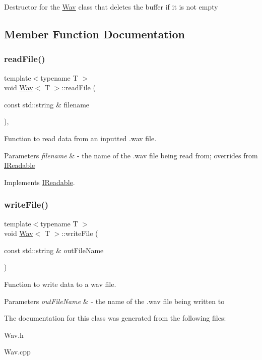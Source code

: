 Destructor for the \hyperlink{classWav}{Wav} class that deletes the buffer if it is not empty 

\subsection{Member Function Documentation}
\mbox{\label{classWav_a636a94bf0f23a4cdc9d8d59d9d567f3e}} 
\subsubsection{\texorpdfstring{read\+File()}{readFile()}}
{\footnotesize\ttfamily template$<$typename T $>$ \\
void \hyperlink{classWav}{Wav}$<$ T $>$\+::read\+File (\begin{DoxyParamCaption}\item[{const std\+::string \&}]{filename }\end{DoxyParamCaption})\hspace{0.3cm}{\ttfamily [override]}, {\ttfamily [virtual]}}



Function to read data from an inputted .wav file. 


\begin{DoxyParams}{Parameters}
{\em filename} & -\/ the name of the .wav file being read from; overrides from \hyperlink{classIReadable}{I\+Readable} \\
\hline
\end{DoxyParams}


Implements \hyperlink{classIReadable}{I\+Readable}.

\mbox{\label{classWav_afbae07371a8e0f17cc8e3a29507016e3}} 
\subsubsection{\texorpdfstring{write\+File()}{writeFile()}}
{\footnotesize\ttfamily template$<$typename T $>$ \\
void \hyperlink{classWav}{Wav}$<$ T $>$\+::write\+File (\begin{DoxyParamCaption}\item[{const std\+::string \&}]{out\+File\+Name }\end{DoxyParamCaption})}



Function to write data to a wav file. 


\begin{DoxyParams}{Parameters}
{\em out\+File\+Name} & -\/ the name of the .wav file being written to \\
\hline
\end{DoxyParams}


The documentation for this class was generated from the following files\+:\begin{DoxyCompactItemize}
\item 
Wav.\+h\item 
Wav.\+cpp\end{DoxyCompactItemize}
